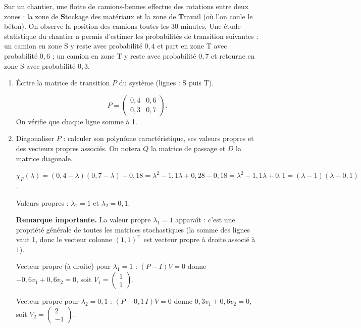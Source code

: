 \medskip

Sur un chantier, une flotte de camions-bennes effectue des rotations entre deux zones : la zone de \textbf{S}tockage des matériaux et la zone de \textbf{T}ravail (où l'on coule le béton). On observe la position des camions toutes les 30 minutes. Une étude statistique du chantier a permis d'estimer les probabilités de transition suivantes : un camion en zone S y reste avec probabilité $0{,}4$ et part en zone T avec probabilité $0{,}6$ ; un camion en zone T y reste avec probabilité $0{,}7$ et retourne en zone S avec probabilité $0{,}3$.

\medskip
\begin{enumerate}[label=\alph*), itemsep=0.6em]
  \item Écrire la matrice de transition $P$ du système (lignes : S puis T).

\begin{solution}
\[
  P = \begin{pmatrix} 0{,}4 & 0{,}6 \\ 0{,}3 & 0{,}7 \end{pmatrix}.
\]
On vérifie que chaque ligne somme à 1.
\end{solution}

  \item Diagonaliser $P$ : calculer son polynôme caractéristique, ses valeurs propres et des vecteurs propres associés. On notera $Q$ la matrice de passage et $D$ la matrice diagonale.

\begin{solution}
$\chi_P(\lambda) = (0{,}4 - \lambda)(0{,}7 - \lambda) - 0{,}18 = \lambda^2 - 1{,}1\lambda + 0{,}28 - 0{,}18 = \lambda^2 - 1{,}1\lambda + 0{,}1 = (\lambda - 1)(\lambda - 0{,}1)$.

Valeurs propres : $\lambda_1 = 1$ et $\lambda_2 = 0{,}1$.

\textbf{Remarque importante.} La valeur propre $\lambda_1 = 1$ apparaît : c'est une propriété générale de toutes les matrices stochastiques (la somme des lignes vaut 1, donc le vecteur colonne $(1, 1)^\top$ est vecteur propre à droite associé à $1$).

Vecteur propre (à droite) pour $\lambda_1 = 1$ : $(P - I)V = 0$ donne $-0{,}6 v_1 + 0{,}6 v_2 = 0$, soit $V_1 = \begin{pmatrix} 1 \\ 1 \end{pmatrix}$.

Vecteur propre pour $\lambda_2 = 0{,}1$ : $(P - 0{,}1\, I)V = 0$ donne $0{,}3 v_1 + 0{,}6 v_2 = 0$, soit $V_2 = \begin{pmatrix} 2 \\ -1 \end{pmatrix}$.


\end{solution}
\end{enumerate}
